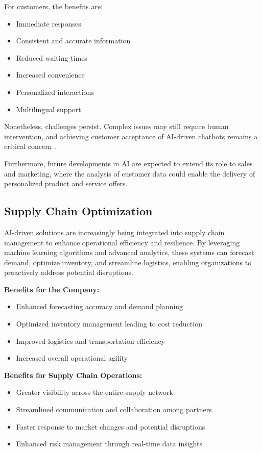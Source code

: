 For customers, the benefits are:
\begin{itemize}
    \item Immediate responses
    \item Consistent and accurate information
    \item Reduced waiting times
    \item Increased convenience
    \item Personalized interactions
    \item Multilingual support
\end{itemize}

Nonetheless, challenges persist. Complex issues may still require human intervention, and achieving customer acceptance of AI-driven chatbots remains a critical concern \cite{Customer-Service-AI-Chatbots}. 

Furthermore, future developments in AI are expected to extend its role to sales and marketing, where the analysis of customer data could enable the delivery of personalized product and service offers.

\subsection{Supply Chain Optimization}

AI-driven solutions are increasingly being integrated into supply chain management to enhance operational efficiency and resilience. By leveraging machine learning algorithms and advanced analytics, these systems can forecast demand, optimize inventory, and streamline logistics, enabling organizations to proactively address potential disruptions.

\textbf{Benefits for the Company:}
\begin{itemize}
    \item Enhanced forecasting accuracy and demand planning
    \item Optimized inventory management leading to cost reduction
    \item Improved logistics and transportation efficiency
    \item Increased overall operational agility
\end{itemize}

\textbf{Benefits for Supply Chain Operations:}
\begin{itemize}
    \item Greater visibility across the entire supply network
    \item Streamlined communication and collaboration among partners
    \item Faster response to market changes and potential disruptions
    \item Enhanced risk management through real-time data insights
\end{itemize}

